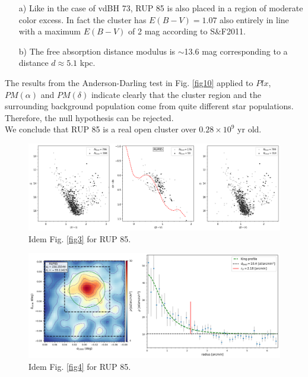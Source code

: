 \documentclass[draft]{aa}
\begin{document}
\begin{itemize}
\item [a)] Like in the case of vdBH 73, RUP 85 is also placed
    in a region of moderate color excess. In fact the cluster has
    $E(B-V)=1.07$ also entirely in line with a maximum $E(B-V)$ of 2
    mag according to S\&F2011.
\item [b)] The free absorption distance modulus is $\sim$13.6 mag corresponding
    to a distance $d\approx5.1$ kpc.
\end{itemize}

The results from the Anderson-Darling test in Fig. \ref{fig10} applied to $Plx$,
$PM(\alpha)$ and $PM(\delta)$ indicate clearly that the cluster region and the
surrounding background population come from quite different star populations.
Therefore, the null hypothesis can be rejected.\\

We conclude that RUP 85 is a real open cluster over $0.28\times10^9$ yr old.

\begin{figure}[ht]
    \centering
    \includegraphics[width=\hsize]{../figs/obs_RUP85.png}
    \caption{Idem Fig. \ref{fig3} for RUP 85.}
    \label{fig7}
\end{figure}

\begin{figure}[ht]
    \centering
    \includegraphics[width=\hsize]{../figs/dmap_rup85.png}
    \caption{Idem Fig. \ref{fig4} for RUP 85.}
    \label{fig8}
\end{figure}
\end{document}
